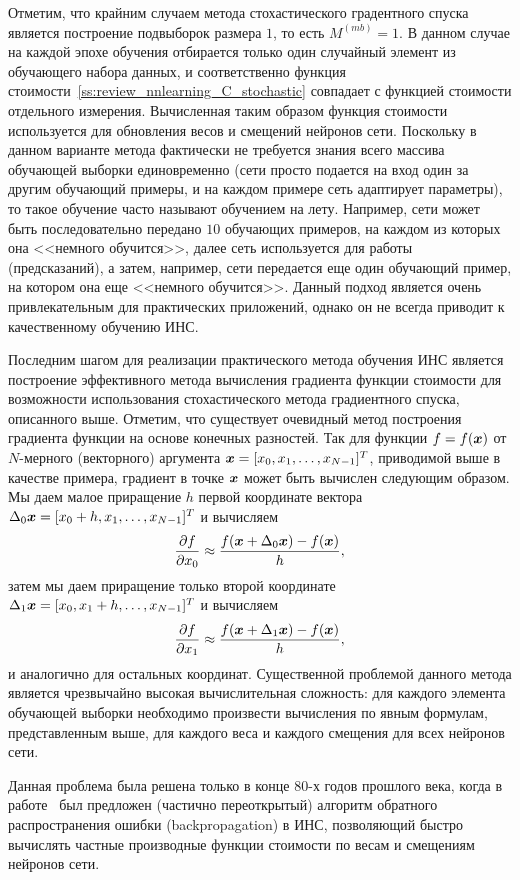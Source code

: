 \documentclass[a4paper,12pt,russian]{article} %
\begin{document}
Отметим, что крайним случаем метода стохастического градентного спуска является построение подвыборок размера $1$, то есть $M^{(mb)}=1$.
В данном случае на каждой эпохе обучения отбирается только один случайный элемент из обучающего набора данных, и соответственно функция стоимости~\eqref{ss:review_nnlearning_C_stochastic} совпадает с функцией стоимости отдельного измерения.
Вычисленная таким образом функция стоимости используется для обновления весов и смещений нейронов сети.
Поскольку в данном варианте метода фактически не требуется знания всего массива обучающей выборки единовременно (сети просто подается на вход один за другим обучающий примеры, и на каждом примере сеть адаптирует параметры), то такое обучение часто называют обучением на лету.
Например, сети может быть последовательно передано $10$ обучающих примеров, на каждом из которых она <<немного обучится>>, далее сеть используется для работы (предсказаний), а затем, например, сети передается еще один обучающий пример, на котором она еще <<немного обучится>>.
Данный подход является очень привлекательным для практических приложений, однако он не всегда приводит к качественному обучению ИНС.

Последним шагом для реализации практического метода обучения ИНС является построение эффективного метода вычисления градиента функции стоимости для возможности использования стохастического метода градиентного спуска, описанного выше.
Отметим, что существует очевидный метод построения градиента функции на основе конечных разностей.
Так для функции $f = f(\bm{x})$ от $N$-мерного (векторного) аргумента $\bm{x} = [x_0, x_1, \ldots, x_{N-1}]^T$, приводимой выше в качестве примера, градиент в точке $\bm{x}$ может быть вычислен следующим образом.
Мы даем малое приращение $h$ первой координате вектора $\Delta_0 \bm{x} = [x_0+h, x_1, \ldots, x_{N-1}]^T$ и вычисляем
$$
		\frac{\partial f}{\partial x_0} \approx \frac{ f(\bm{x}+ \Delta_0 \bm{x} ) - f(\bm{x})}{h},
$$
затем мы даем приращение только второй координате $\Delta_1 \bm{x} = [x_0, x_1+h, \ldots, x_{N-1}]^T$ и вычисляем
$$
		\frac{\partial f}{\partial x_1} \approx \frac{ f(\bm{x}+ \Delta_1 \bm{x} ) - f(\bm{x})}{h},
$$
и аналогично для остальных координат.
Существенной проблемой данного метода является чрезвычайно высокая вычислительная сложность: для каждого элемента обучающей выборки необходимо произвести вычисления по явным формулам, представленным выше, для каждого веса и каждого смещения для всех нейронов сети.

Данная проблема была решена только в конце 80-х годов прошлого века, когда в работе~\cite{williams1986learning} был предложен (частично переоткрытый) алгоритм обратного распространения ошибки (backpropagation) в ИНС, позволяющий быстро вычислять частные производные функции стоимости по весам и смещениям нейронов сети.
\end{document}
